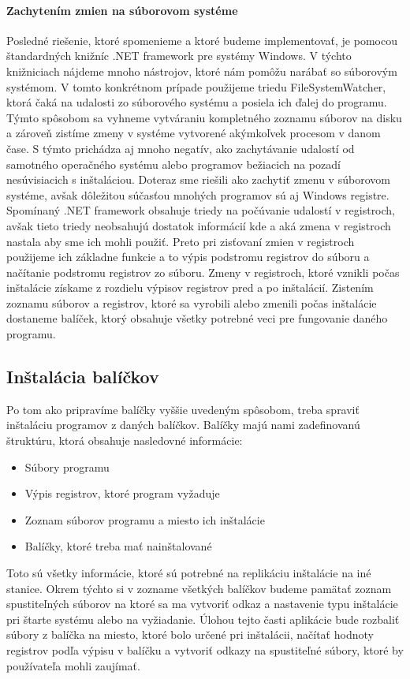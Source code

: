 \paragraph{Zachytením zmien na súborovom systéme}
Posledné riešenie, ktoré spomenieme a ktoré budeme implementovať, je pomocou štandardných knižníc .NET framework pre systémy Windows. V týchto knižniciach nájdeme mnoho nástrojov, ktoré nám pomôžu narábať so súborovým systémom. V tomto konkrétnom prípade použijeme triedu FileSystemWatcher, ktorá čaká na udalosti zo súborového systému a posiela ich ďalej do programu. Týmto spôsobom sa vyhneme vytváraniu kompletného zoznamu súborov na disku a zároveň zistíme zmeny v systéme vytvorené akýmkoľvek procesom v danom čase. S týmto prichádza aj mnoho negatív, ako zachytávanie udalostí od samotného operačného systému alebo programov bežiacich na pozadí nesúvisiacich s inštaláciou. Doteraz sme riešili ako zachytiť zmenu v súborovom systéme, avšak dôležitou súčasťou mnohých programov sú aj Windows registre. Spomínaný .NET framework obsahuje triedy na počúvanie udalostí v registroch, avšak tieto triedy neobsahujú dostatok informácií kde a aká zmena v registroch nastala aby sme ich mohli použiť. Preto pri zisťovaní zmien v registroch použijeme ich základne funkcie a to výpis podstromu  registrov do súboru a načítanie podstromu registrov zo súboru. Zmeny v registroch, ktoré vznikli počas inštalácie získame z rozdielu výpisov registrov pred a po inštalácií. Zistením zoznamu súborov a registrov, ktoré sa vyrobili alebo zmenili počas inštalácie dostaneme balíček, ktorý obsahuje všetky potrebné veci pre fungovanie daného programu.

\subsection{Inštalácia balíčkov}
Po tom ako pripravíme balíčky vyššie uvedeným spôsobom, treba spraviť inštaláciu programov z daných balíčkov. Balíčky majú nami zadefinovanú štruktúru, ktorá obsahuje nasledovné informácie:

\begin{itemize}
\item Súbory programu
\item Výpis registrov, ktoré program vyžaduje
\item Zoznam súborov programu a miesto ich inštalácie
\item Balíčky, ktoré treba mať nainštalované
\end{itemize}

Toto sú všetky informácie, ktoré sú potrebné na replikáciu inštalácie na iné stanice. Okrem týchto si v zozname všetkých balíčkov budeme pamätať zoznam spustiteľných súborov na ktoré sa ma vytvoriť odkaz a nastavenie typu inštalácie pri štarte systému alebo na vyžiadanie. Úlohou tejto časti aplikácie bude rozbaliť súbory z balíčka na miesto, ktoré bolo určené pri inštalácii, načítať hodnoty registrov podľa výpisu v balíčku a vytvoriť odkazy na spustiteľné súbory, ktoré by používateľa mohli zaujímať.

